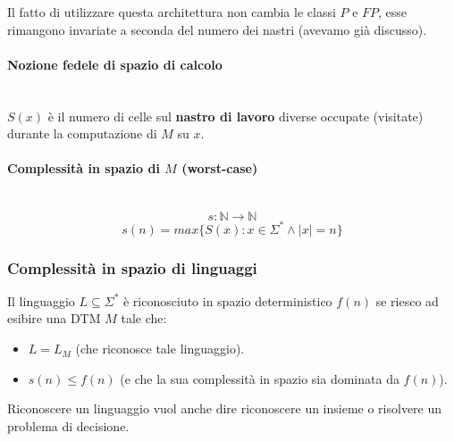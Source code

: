 \documentclass{article}
\begin{document}
Il fatto di utilizzare questa architettura non cambia le classi $P$ e $FP$, esse rimangono
invariate a seconda del numero dei nastri (avevamo già discusso).

\paragraph{Nozione fedele di spazio di calcolo}\mbox{}\\
$S(x)$ è il numero di celle sul \textbf{nastro di lavoro} diverse occupate (visitate) durante la computazione
di $M$ su $x$.

\paragraph{Complessità in spazio di $M$ (worst-case)}\mbox{}\\
$$s:\mathbb{N}\rightarrow\mathbb{N}$$
$$s(n)=max\{S(x):x\in\Sigma^*\land|x|=n\}$$

\subsubsection{Complessità in spazio di linguaggi}
Il linguaggio $L\subseteq\Sigma^*$ è riconosciuto in spazio deterministico $f(n)$ se riesco
ad esibire una DTM $M$ tale che:
\begin{itemize}
    \item $L=L_M$ (che riconosce tale linguaggio).
    \item $s(n)\leq f(n)$ (e che la sua complessità in spazio sia dominata da $f(n)$).
\end{itemize}
Riconoscere un linguaggio vuol anche dire riconoscere un insieme o risolvere un problema di
decisione.
\end{document}
